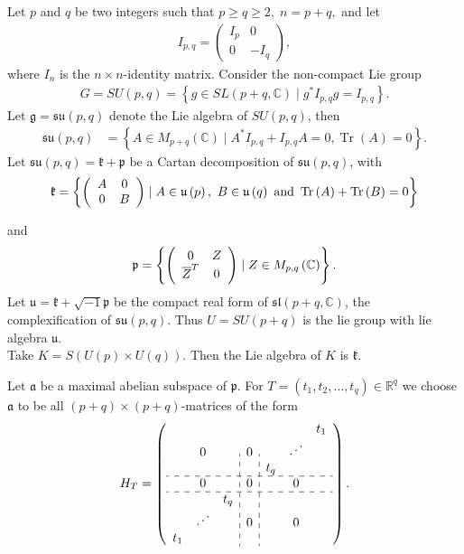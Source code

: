 \documentclass[11pt,a4paper]{amsart}
\DeclareMathOperator{\Tr}{Tr}
\theoremstyle{definition}
\numberwithin{equation}{section}
\begin{document}
Let $p$ and $q$ be two integers such that $p \geq q \geq 2,\; n = p + q,$ and let \begin{align*}
I_{p,q}=\begin{pmatrix}
I_p&0\\
0&-I_q
\end{pmatrix},
\end{align*}
where $I_n$ is the $n\times n$-identity matrix.    Consider the non-compact Lie group  \begin{align*}
G= SU(p,q) = \left\{   g\in SL(p+q,\mathbb{C} ) \mid g^*I_{p,q}g=I_{p,q} \right\}.
\end{align*}
Let $\mathfrak{g}=  \mathfrak{su}(p,q) $ denote  the  Lie algebra of  $SU(p,q)$, then {  \begin{align*}
\mathfrak{su}\left(  p,q\right) 
&  =\left\{  A\in M_{p+q}(\mathbb{C})\mid A^{\ast}I_{p,q}+I_{p,q}A=0, \Tr\left(  A\right)  =0\right\}.
\end{align*}}
Let $\mathfrak{su}(p,q) = \mathfrak{k}+\mathfrak{p}$ be a Cartan decomposition of $\mathfrak{su}(p,q)$, with 
\begin{align*}
\mathfrak{k}=\left\{ \left(
\begin{array}
[c]{cc}%
A & 0\\
0 & B
\end{array}
\right)  \mid A\in\mathfrak{u}\left(  p\right)  ,\text{ }B\in\mathfrak{u}%
\left(  q\right)  \text{ and }\Tr\left(  A\right) +\Tr\left( B\right)  =0\right\}
\end{align*}

and \begin{align*}
\mathfrak{p}=\left\{  \left(
\begin{array}
[c]{cc}%
0 & Z\\
\overline{Z}^{T} & 0
\end{array}
\right)  \mid Z\in M_{p,q}\left(\mathbb{C}\right)  \right\}.
\end{align*} Let $ \mathfrak{u}= \mathfrak{k}+\sqrt{-1}\mathfrak{p}$ be the compact real form of $\mathfrak{sl}(p+q, \mathbb{C})$,  the complexification of $\mathfrak{su}(p,q)$. Thus $ U=SU(p+q)$ is the lie group with lie algebra $\mathfrak{u}$. \\ Take $K = S\left(U(p)\times U(q) \right)$. Then the Lie algebra of $K$ is $\mathfrak{k}$.
  
Let $\mathfrak{a}$ be a maximal abelian subspace of $\mathfrak{p}$. For $ T= (t_1, t_2, \dots , t_q)\in \mathbb{R}^q$ we  choose $\mathfrak{a}$ to be all  $(p+q)\times (p+q)$-matrices of the form \[ H_T =\left(\begin{array}
[c]{ccc:c:ccc}
&  &  &  &  &  & t_{1}\\
& 0 &  & 0 &  & \reflectbox{$\ddots$} & \\
&  &  &  & t_{q} &  & \\
\hdashline & 0 &  & 0 &  & 0 & \\
\hdashline &  & t_{q} &  &  &  & \\
& \reflectbox{$\ddots$} &  & 0 &  & 0 & \\
t_{1} &  &  &  &  &  &
\end{array}
\right).
\]
\end{document}
